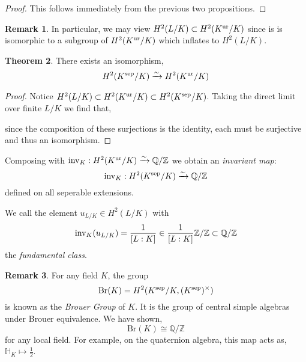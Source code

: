 \documentclass[12pt]{extarticle}
\newcommand{\Z}{\mathbb{Z}}
\newcommand{\Q}{\mathbb{Q}}
\theoremstyle{definition}
\newtheorem{theorem}{Theorem}[section]
\newtheorem{remark}[theorem]{Remark}
\newenvironment{definition}[1][Definition:]{\begin{trivlist}
\item[\hskip \labelsep {\bfseries #1}]}{\end{trivlist}}
\begin{document}
\begin{proof}
This follows immediately from the previous two propositions. 
\end{proof}

\begin{remark}
In particular, we may view $H^2(L/ K) \subset H^2(K^{\mathrm{ur}} / K)$ since is is isomorphic to a subgroup of $H^2(K^{\mathrm{ur}} / K)$ which inflates to $H^2(L / K)$.
\end{remark}

\begin{theorem}
There exists an isomorphism,
\[ H^2(K^{\mathrm{sep}} / K) \xrightarrow{\sim} H^2(K^{\mathrm{ur}} / K) \]
\end{theorem}

\begin{proof}
Notice $H^2(L / K) \subset H^2(K^{\mathrm{ur}} / K) \subset H^2(K^{\mathrm{sep}} / K)$. Taking the direct limit over finite $L / K$ we find that,
\begin{center}
\end{center} 
since the composition of these surjections is the identity, each must be surjective and thus an isomorphism. 
\end{proof}

\begin{definition}
Composing with $\inv_K : H^2(K^\ur / K) \xrightarrow{\sim} \Q / \Z$ we obtain an \textit{invariant map}:
\[ \inv_K : H^2(K^\sep / K) \xrightarrow{\sim} \Q / \Z \]
defined on all seperable extensions. 
\end{definition}

\begin{definition}
We call the element $u_{L/K} \in H^2(L / K)$ with 
\[ \inv_K(u_{L/K}) = \frac{1}{[L : K]} \in \frac{1}{[L : K]} \Z / \Z \subset \Q / \Z \]
the \textit{fundamental class}.
\end{definition}

\newcommand{\Br}{\mathrm{Br}}

\begin{remark}
For any field $K$, the group
\[ \Br(K) = H^2(K^\sep / K, (K^\sep)^\times)  \]
is known as the \textit{Brouer Group} of $K$. It is the group of central simple algebras under Brouer equivalence. We have shown,
\[ \Br(K) \cong \Q / \Z \]
for any local field. For example, on the quaternion algebra, this map acts as, $\mathbb{H}_K \mapsto \tfrac{1}{2}$.
\end{remark}
\end{document}
